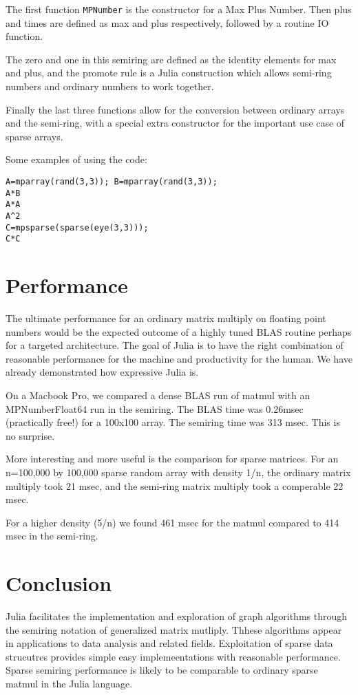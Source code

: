 \documentclass[conference]{IEEEtran}
\begin{document}
The first function \verb+MPNumber+ is the constructor for a Max Plus Number.
Then plus and times are defined as max and plus respectively, followed by 
a routine IO function.

The zero and one in this semiring are defined as the identity elements for max and plus,
and the promote rule is a Julia construction which allows semi-ring numbers and ordinary
numbers to work together.

Finally the last three functions allow for the conversion between ordinary arrays and the semi-ring, with a special extra constructor for the important use case of sparse arrays.

Some examples of using the code:


\begin{verbatim}
A=mparray(rand(3,3)); B=mparray(rand(3,3));
A*B
A*A
A^2
C=mpsparse(sparse(eye(3,3)));
C*C
\end{verbatim}





\section{Performance}

The ultimate performance for an ordinary matrix multiply on floating point numbers 
would be the expected outcome of a highly tuned BLAS routine perhaps for a targeted
architecture.  The goal of Julia is to have the right combination of reasonable performance
for the machine and productivity for the human.  We have already demonstrated how expressive
Julia is.

On a Macbook Pro, we compared a dense BLAS run of matmul with an MPNumber{Float64} run in the semiring.
The BLAS time was 0.26msec (practically free!) for a 100x100 array.  The semiring time
was 313 msec.  This is no surprise.

More interesting and more useful is the comparison for sparse matrices.  For an n=100,000 by 100,000 sparse random array with density 1/n, the ordinary matrix multiply took 21 msec, and the semi-ring matrix multiply took a comperable
22 msec.

For a higher density (5/n) we found 461 msec for the matmul compared to 414 msec in the semi-ring.




\section{Conclusion}

Julia facilitates the implementation and exploration of graph algorithms through
the semiring notation of generalized matrix mutliply.  Thhese algorithms appear
in applications to data analysis and related fields.  Exploitation of sparse data 
strucutres provides simple easy implemeentations with reasonable performance.
Sparse semiring performance is likely to be comparable to ordinary sparse matmul in the Julia
language.




\end{document}
